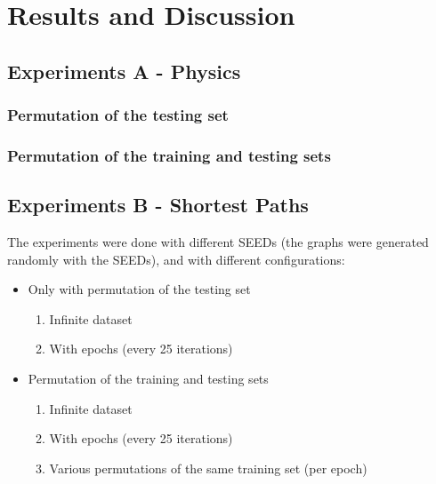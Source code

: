 \section{Results and Discussion}


\subsection{Experiments A - Physics}

\subsubsection {Permutation of the testing set}

\subsubsection {Permutation of the training and testing sets}

\subsection{Experiments B - Shortest Paths}

The experiments were done with different SEEDs (the graphs were generated randomly with the SEEDs), and with different configurations:

\begin{itemize}
    \item Only with permutation of the testing set
    
    \begin{enumerate}[label=(\Alph*)]

        \item Infinite dataset
        
        \item With epochs (every 25 iterations)

    \end{enumerate}
    
    \item Permutation of the training and testing sets
    
    \begin{enumerate}[label=(\Alph*)]

        \item Infinite dataset
        
        \item With epochs (every 25 iterations)
        
        \item Various permutations of the same training set (per epoch)

    \end{enumerate}
\end{itemize}

